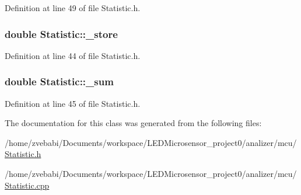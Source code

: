 Definition at line 49 of file Statistic.\+h.

\hypertarget{class_statistic_a3c91ba1c8c8f0d20c803e3970d0a2a7e}{
\subsubsection[{\+\_\+store}]{\setlength{\rightskip}{0pt plus 5cm}double Statistic\+::\+\_\+store\hspace{0.3cm}{\ttfamily [protected]}}}\label{class_statistic_a3c91ba1c8c8f0d20c803e3970d0a2a7e}


Definition at line 44 of file Statistic.\+h.

\hypertarget{class_statistic_aef8ea05f388c51bed8e7261059c84c7a}{
\subsubsection[{\+\_\+sum}]{\setlength{\rightskip}{0pt plus 5cm}double Statistic\+::\+\_\+sum\hspace{0.3cm}{\ttfamily [protected]}}}\label{class_statistic_aef8ea05f388c51bed8e7261059c84c7a}


Definition at line 45 of file Statistic.\+h.



The documentation for this class was generated from the following files\+:\begin{DoxyCompactItemize}
\item 
/home/zvebabi/\+Documents/workspace/\+L\+E\+D\+Microsensor\+\_\+project0/analizer/mcu/\hyperlink{_statistic_8h}{Statistic.\+h}\item 
/home/zvebabi/\+Documents/workspace/\+L\+E\+D\+Microsensor\+\_\+project0/analizer/mcu/\hyperlink{_statistic_8cpp}{Statistic.\+cpp}\end{DoxyCompactItemize}
